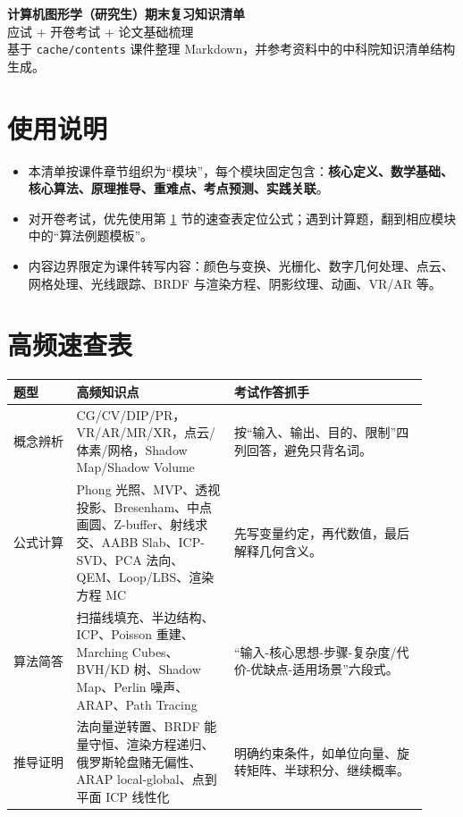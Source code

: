 \documentclass[UTF8,zihao=-4,scheme=chinese,fontset=fandol]{ctexart}
\newcommand{\key}[1]{\textbf{#1}}
\begin{document}
\begin{center}
{\bfseries 计算机图形学（研究生）期末复习知识清单}\\[0.4em]
{\large 应试 + 开卷考试 + 论文基础梳理}\\[0.6em]
{\small 基于 \texttt{cache/contents} 课件整理 Markdown，并参考资料中的中科院知识清单结构生成。}
\end{center}

\vspace{0.5em}
\tableofcontents
\newpage

\section*{使用说明}
\begin{itemize}
  \item 本清单按课件章节组织为“模块”，每个模块固定包含：\key{核心定义、数学基础、核心算法、原理推导、重难点、考点预测、实践关联}。
  \item 对开卷考试，优先使用第 \ref{sec:quick} 节的速查表定位公式；遇到计算题，翻到相应模块中的“算法例题模板”。
  \item 内容边界限定为课件转写内容：颜色与变换、光栅化、数字几何处理、点云、网格处理、光线跟踪、BRDF 与渲染方程、阴影纹理、动画、VR/AR 等。
\end{itemize}

\section{高频速查表}
\label{sec:quick}

\begin{longtable}{p{0.14\linewidth}p{0.35\linewidth}p{0.43\linewidth}}
\toprule
\textbf{题型} & \textbf{高频知识点} & \textbf{考试作答抓手}\\
\midrule
概念辨析 & CG/CV/DIP/PR，VR/AR/MR/XR，点云/体素/网格，Shadow Map/Shadow Volume & 按“输入、输出、目的、限制”四列回答，避免只背名词。\\
公式计算 & Phong 光照、MVP、透视投影、Bresenham、中点画圆、Z-buffer、射线求交、AABB Slab、ICP-SVD、PCA 法向、QEM、Loop/LBS、渲染方程 MC & 先写变量约定，再代数值，最后解释几何含义。\\
算法简答 & 扫描线填充、半边结构、ICP、Poisson 重建、Marching Cubes、BVH/KD 树、Shadow Map、Perlin 噪声、ARAP、Path Tracing & “输入-核心思想-步骤-复杂度/代价-优缺点-适用场景”六段式。\\
推导证明 & 法向量逆转置、BRDF 能量守恒、渲染方程递归、俄罗斯轮盘赌无偏性、ARAP local-global、点到平面 ICP 线性化 & 明确约束条件，如单位向量、旋转矩阵、半球积分、继续概率。\\
\bottomrule
\end{longtable}
\end{document}
